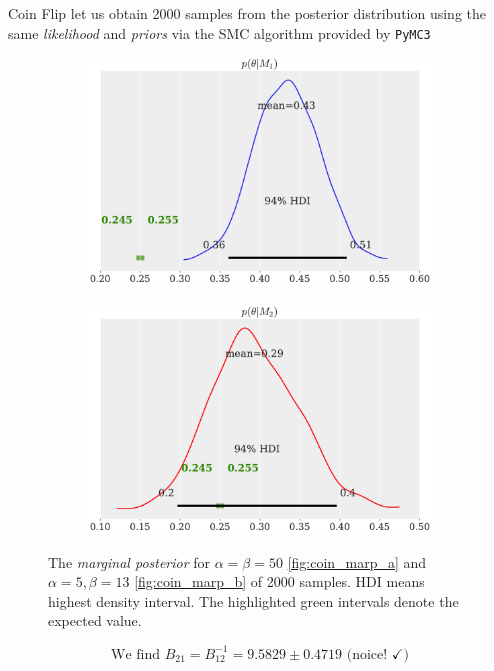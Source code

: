 \documentclass[11pt,aspectratio=1610,dvipsnames]{beamer}
\begin{document}
\begin{frame}{Coin Flip}
	let us obtain 2000 samples from the posterior distribution using the same \emph{likelihood} and \emph{priors} via the SMC algorithm provided by \texttt{PyMC3}
	\begin{figure}[htbp]
		\begin{subfigure}{.49\linewidth}
			\includegraphics[width=0.9\linewidth]{coin_marp_m1.pdf}
			\subcaption{}\label{fig:coin_marp_a}
		\end{subfigure}
		\begin{subfigure}{.49\linewidth}
			\includegraphics[width=0.9\linewidth]{coin_marp_m2.pdf}
			\subcaption{}\label{fig:coin_marp_b}
		\end{subfigure}
		\caption{The \emph{marginal posterior} for $\alpha=\beta=50$ \eqref{fig:coin_marp_a} and $\alpha=5, \beta=13$ \eqref{fig:coin_marp_b} of 2000 samples. HDI means highest density interval. The highlighted green intervals denote the expected value.}\label{fig:coin_marp}
	\end{figure}
 $$\text{We find }B_{21}=B_{12}^{-1}=9.5829\pm0.4719  \text{ (noice! } \checkmark)$$
\end{frame}
\end{document}

